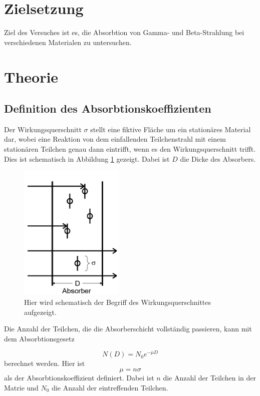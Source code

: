 \section{Zielsetzung}
Ziel des Versuches ist es, die Absorbtion von Gamma- und Beta-Strahlung bei verschiedenen Materialen zu untersuchen. 

\section{Theorie}
\label{sec:Theorie}

\subsection{Definition des Absorbtionskoeffizienten}
Der Wirkungsquerschnitt $\sigma$ stellt eine fiktive Fläche um ein stationäres Material dar, wobei eine Reaktion von dem einfallenden Teilchenstrahl mit einem stationären Teilchen genau dann eintrifft,
wenn es den Wirkungsquerschnitt trifft. Dies ist schematisch in Abbildung \ref{fig:WQ} gezeigt. Dabei ist $D$ die Dicke des Absorbers.


\begin{figure}[H]
    \centering
    \includegraphics[width=5cm]{Bilder/WQ.png}
    \caption{Hier wird schematisch der Begriff des Wirkungsquerschnittes aufgezeigt.}
    \label{fig:WQ}
\end{figure}

\noindent Die Anzahl der Teilchen, die die Absorberschicht vollständig passieren, kann mit dem Absorbtionsgesetz

\begin{equation}
    N(D)=N_0 e^{-\mu D}
    \label{eqn:Absorberschicht}
\end{equation}
berechnet werden. 
Hier ist 
\begin{equation}
    \mu = n \sigma 
    \label{eqn:Absorbtionskoeffizient 
}\end{equation}  \noindent als der Absorbtionskoeffizient definiert. 
Dabei ist $n$ die Anzahl der Teilchen in der Matrie und $N_0$ die Anzahl der eintreffenden Teilchen.


